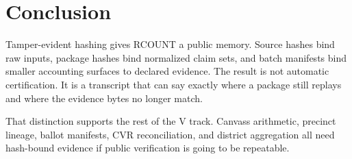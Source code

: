 \section{Conclusion}

Tamper-evident hashing gives RCOUNT a public memory. Source hashes bind raw
inputs, package hashes bind normalized claim sets, and batch manifests bind
smaller accounting surfaces to declared evidence. The result is not automatic
certification. It is a transcript that can say exactly where a package still
replays and where the evidence bytes no longer match.

That distinction supports the rest of the V track. Canvass arithmetic, precinct
lineage, ballot manifests, CVR reconciliation, and district aggregation all need
hash-bound evidence if public verification is going to be repeatable.
